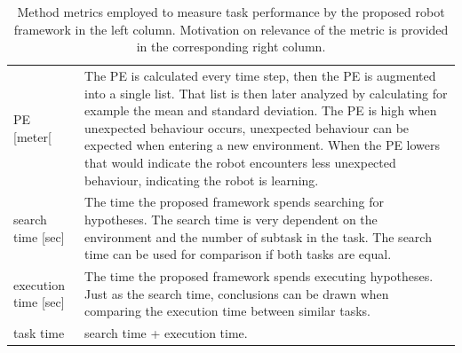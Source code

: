 \noindent
\begin{table}[H]
\centering
\begin{tabular}%
  {>{\raggedright\arraybackslash}p{}%
   >{\raggedright\arraybackslash}p{}}
\acl{PE} [meter[ & The \ac{PE} is calculated every time step, then the \ac{PE} is augmented into a single list. That list is then later analyzed by calculating for example the mean and standard deviation. The \ac{PE} is high when unexpected behaviour occurs, unexpected behaviour can be expected when entering a new environment. When the \ac{PE} lowers that would indicate the robot encounters less unexpected behaviour, indicating the robot is learning.\\
search time [sec]& The time the proposed framework spends searching for hypotheses. The search time is very dependent on the environment and the number of subtask in the task. The search time can be used for comparison if both tasks are equal.\\ 
execution time [sec] & The time the proposed framework spends executing hypotheses. Just as the search time, conclusions can be drawn when comparing the execution time between similar tasks.\\ 
task time & search time + execution time. \\
\end{tabular}
\caption{Method metrics employed to measure task performance by the proposed robot framework in the left column. Motivation on relevance of the metric is provided in the corresponding right column.}\label{table:proposed_method_metrics}
\end{table}

